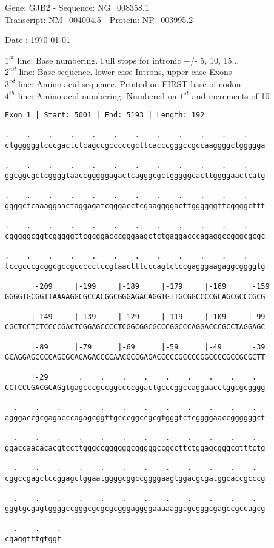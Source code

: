 \documentclass{article}
\begin{document}
\begin{center}
\begin{large}
Gene: GJB2 - Sequence: NG\_008358.1\\
Transcript: NM\_004004.5 - Protein: NP\_003995.2
 
 Date : \today
\end{large}
\end{center}
$1^{st}$ line: Base numbering. Full stops for intronic +/- 5, 10, 15...\\
$2^{nd}$ line: Base sequence. lower case Introns, upper case Exons\\
$3^{rd}$ line: Amino acid sequence. Printed on FIRST base of codon\\
$4^{th}$ line: Amino acid numbering. Numbered on $1^{st}$ and increments of 10\\
\begin{Verbatim}
Exon 1 | Start: 5001 | End: 5193 | Length: 192
 
.    .    .    .    .    .    .    .    .    .    .    .    
ctggggggtcccgactctcagccgcccccgcttcacccgggccgccaaggggctggggga
  
.    .    .    .    .    .    .    .    .    .    .    .    
ggcggcgctcggggtaaccgggggagactcagggcgctgggggcacttggggaactcatg
  
.    .    .    .    .    .    .    .    .    .    .    .    
ggggctcaaaggaactaggagatcgggacctcgaaggggacttggggggttcggggcttt
  
.    .    .    .    .    .    .    .    .    .    .    .    
cgggggcggtcgggggttcgcggacccgggaagctctgaggacccagaggccgggcgcgc
  
.    .    .    .    .    .    .    .    .    .    .    .    
tccgcccgcggcgccgccccctccgtaactttcccagtctccgagggaagaggcggggtg
  
      |-209     |-199     |-189     |-179     |-169     |-159
GGGGTGCGGTTAAAAGGCGCCACGGCGGGAGACAGGTGTTGCGGCCCCGCAGCGCCCGCG
  
      |-149     |-139     |-129     |-119     |-109     |-99
CGCTCCTCTCCCCGACTCGGAGCCCCTCGGCGGCGCCCGGCCCAGGACCCGCCTAGGAGC
  
      |-89      |-79      |-69      |-59      |-49      |-39
GCAGGAGCCCCAGCGCAGAGACCCCAACGCCGAGACCCCCGCCCCGGCCCCGCCGCGCTT
  
      |-29       .    .    .    .    .    .    .    .    .  
CCTCCCGACGCAGgtgagcccgccggccccggactgcccggccaggaacctggcgcgggg
  
  .    .    .    .    .    .    .    .    .    .    .    .  
agggaccgcgagacccagagcggttgcccggccgcgtgggtctcggggaaccggggggct
  
  .    .    .    .    .    .    .    .    .    .    .    .  
ggaccaacacacgtccttgggccggggggcgggggccgccttctggagcgggcgtttctg
  
  .    .    .    .    .    .    .    .    .    .    .    .  
cggccgagctccggagctggaatggggcggccggggaagtggacgcgatggcaccgcccg
  
  .    .    .    .    .    .    .    .    .    .    .    .  
gggtgcgagtggggccgggcgcgcgcgggaggggaaaaaggcgcgggcgagccgccagcg
  
  .    .    .
cgaggtttgtggt
\end{Verbatim}
\end{document}
